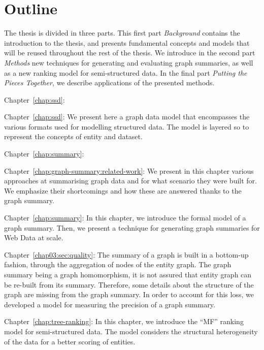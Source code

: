 \section{Outline}

The thesis is divided in three parts. This first part \emph{Background} contains the introduction to the thesis, and presents fundamental concepts and models that will be reused throughout the rest of the thesis. We introduce in the second part \emph{Methods} new techniques for generating and evaluating graph summaries, as well as a new ranking model for semi-structured data. In the final part \emph{Putting the Pieces Together}, we describe applications of the presented methods.


\begin{labeling}{Chapter~\ref{chap:ssd}:}
\item[Chapter~\ref{chap:ssd}:] We present here a graph data model that encompasses the various formats used for modelling structured data. The model is layered so to represent the concepts of entity and dataset.%
\end{labeling}


\begin{labeling}{Chapter~\ref{chap:summary}:}
\item[Chapter~\ref{chap:graph-summary:related-work}:] We present in this chapter various approaches at summarising graph data and for what scenario they were built for. We emphasize their shortcomings and how these are answered thanks to the graph summary.
\item[Chapter~\ref{chap:summary}:] In this chapter, we introduce the formal model of a graph summary. Then, we present a technique for generating graph summaries for Web Data at scale.
\item[Chapter~\ref{chap03:sec:quality}:] The summary of a graph is built in a bottom-up fashion, through the aggregation of nodes of the entity graph. The graph summary being a graph homomorphism, it is not assured that entity graph can be re-built from its summary. Therefore, some details about the structure of the graph are missing from the graph summary. In order to account for this loss, we developed a model for measuring the precision of a graph summary.
\item[Chapter~\ref{chap:tree-ranking}:] In this chapter, we introduce the ``MF'' ranking model for semi-structured data. The model considers the structural heterogeneity of the data for a better scoring of entities.
\end{labeling}

